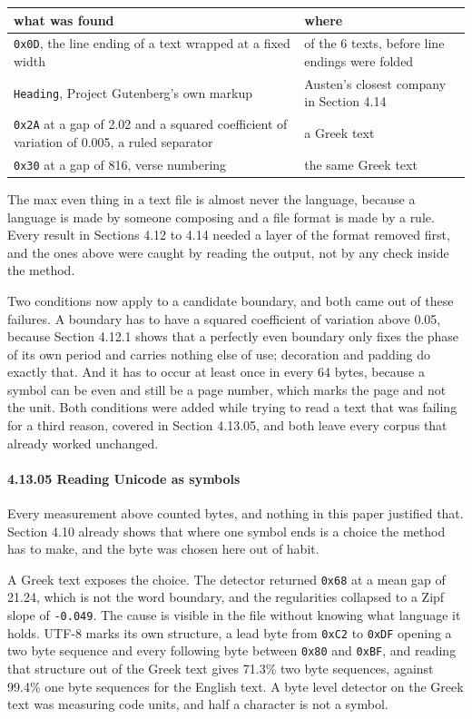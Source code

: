 \tiny
\setlength{\tabcolsep}{2pt}
\begin{longtable}{@{}>{\raggedright\arraybackslash}p{}>{\raggedright\arraybackslash}p{}@{}}
\toprule
what was found & where \\
\midrule
\texttt{0x0D}, the line ending of a text wrapped at a fixed width & 5 of the 6 texts, before line endings were folded \\
\texttt{Heading}, Project Gutenberg's own markup & Austen's closest company in Section 4.14 \\
\texttt{0x2A} at a gap of 2.02 and a squared coefficient of variation of 0.005, a ruled separator & a Greek text \\
\texttt{0x30} at a gap of 816, verse numbering & the same Greek text \\
\bottomrule
\end{longtable}
\normalsize

The max even thing in a text file is almost never the language, because a language is made by someone composing and a file format is made by a rule. Every result in Sections 4.12 to 4.14 needed a layer of the format removed first, and the ones above were caught by reading the output, not by any check inside the method.

Two conditions now apply to a candidate boundary, and both came out of these failures. A boundary has to have a squared coefficient of variation above 0.05, because Section 4.12.1 shows that a perfectly even boundary only fixes the phase of its own period and carries nothing else of use; decoration and padding do exactly that. And it has to occur at least once in every 64 bytes, because a symbol can be even and still be a page number, which marks the page and not the unit. Both conditions were added while trying to read a text that was failing for a third reason, covered in Section 4.13.05, and both leave every corpus that already worked unchanged.

\paragraph{4.13.05 Reading Unicode as symbols}

Every measurement above counted bytes, and nothing in this paper justified that. Section 4.10 already shows that where one symbol ends is a choice the method has to make, and the byte was chosen here out of habit.

A Greek text exposes the choice. The detector returned \texttt{0x68} at a mean gap of 21.24, which is not the word boundary, and the regularities collapsed to a Zipf slope of \texttt{-\allowbreak{}0.\allowbreak{}049}. The cause is visible in the file without knowing what language it holds. UTF-8 marks its own structure, a lead byte from \texttt{0x\allowbreak{}C2} to \texttt{0x\allowbreak{}DF} opening a two byte sequence and every following byte between \texttt{0x80} and \texttt{0x\allowbreak{}BF}, and reading that structure out of the Greek text gives 71.3\% two byte sequences, against 99.4\% one byte sequences for the English text. A byte level detector on the Greek text was measuring code units, and half a character is not a symbol.

